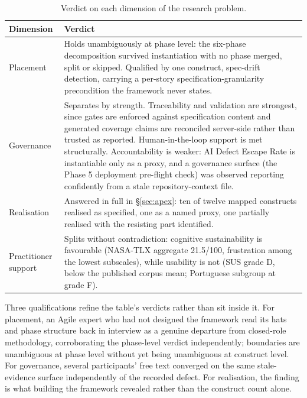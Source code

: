 \documentclass[sigconf,review=false]{acmart}
\begin{document}
\begin{table}[H]
\centering
\caption{Verdict on each dimension of the research problem.}
\label{tab:drq}
\footnotesize
\begin{tabular}{@{}p{1.9cm}p{5.9cm}@{}}
\toprule
\textbf{Dimension} & \textbf{Verdict} \\
\midrule
Placement & Holds unambiguously at phase level: the six-phase decomposition survived instantiation with no phase merged, split or skipped. Qualified by one construct, spec-drift detection, carrying a per-story specification-granularity precondition the framework never states. \\
Governance & Separates by strength. Traceability and validation are strongest, since gates are enforced against specification content and generated coverage claims are reconciled server-side rather than trusted as reported. Human-in-the-loop support is met structurally. Accountability is weaker: AI Defect Escape Rate is instantiable only as a proxy, and a governance surface (the Phase 5 deployment pre-flight check) was observed reporting confidently from a stale repository-context file. \\
Realisation & Answered in full in \S\ref{sec:apex}: ten of twelve mapped constructs realised as specified, one as a named proxy, one partially realised with the resisting part identified. \\
Practitioner support & Splits without contradiction: cognitive sustainability is favourable (NASA-TLX aggregate 21.5/100, frustration among the lowest subscales), while usability is not (SUS grade D, below the published corpus mean; Portuguese subgroup at grade F). \\
\bottomrule
\end{tabular}
\end{table}

Three qualifications refine the table's verdicts rather than sit inside it. For placement, an Agile expert who had not designed the framework read its hats and phase structure back in interview as a genuine departure from closed-role methodology, corroborating the phase-level verdict independently; boundaries are unambiguous at phase level without yet being unambiguous at construct level. For governance, several participants' free text converged on the same stale-evidence surface independently of the recorded defect. For realisation, the finding is what building the framework revealed rather than the construct count alone.
\end{document}
